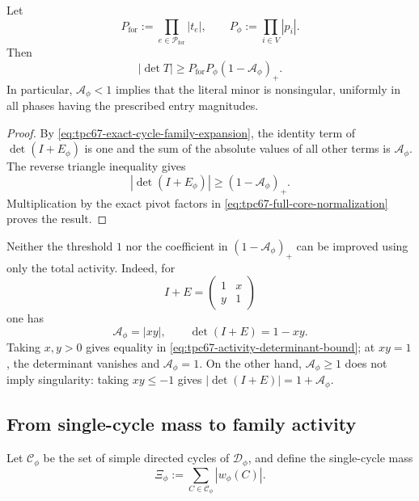 \begin{theorem}
\label{thm:tpc67-activity-certificate}
Let
\[
 P_{\mathrm{for}}
 :=
 \prod_{e\in\mathcal P_{\mathrm{for}}}|t_e|,
 \qquad
 P_\phi:=\prod_{i\in V}|p_i|.
\]
Then
\begin{equation}
 \boxed{
 |\det T|
 \ge
 P_{\mathrm{for}}P_\phi
 (1-\mathcal A_\phi)_+.}
 \label{eq:tpc67-activity-determinant-bound}
\end{equation}
In particular, \(\mathcal A_\phi<1\) implies that the literal minor is
nonsingular, uniformly in all phases having the prescribed entry
magnitudes.
\end{theorem}

\begin{proof}
By \eqref{eq:tpc67-exact-cycle-family-expansion}, the identity term of
\(\det(I+E_\phi)\) is one and the sum of the absolute values of all other
terms is \(\mathcal A_\phi\).  The reverse triangle inequality gives
\[
 |\det(I+E_\phi)|
 \ge (1-\mathcal A_\phi)_+.
\]
Multiplication by the exact pivot factors in
\eqref{eq:tpc67-full-core-normalization} proves the result.
\end{proof}

\begin{proposition}
\label{prop:tpc67-activity-threshold-sharp}
Neither the threshold \(1\) nor the coefficient in
\((1-\mathcal A_\phi)_+\) can be improved using only the total activity.
Indeed, for
\begin{equation}
 I+E=
 \begin{pmatrix}
 1&x\\
 y&1
 \end{pmatrix}
 \label{eq:tpc67-two-cycle-model}
\end{equation}
one has
\[
 \mathcal A_\phi=|xy|,
 \qquad
 \det(I+E)=1-xy.
\]
Taking \(x,y>0\) gives equality in
\eqref{eq:tpc67-activity-determinant-bound}; at \(xy=1\), the determinant
vanishes and \(\mathcal A_\phi=1\).  On the other hand,
\(\mathcal A_\phi\ge1\) does not imply singularity: taking \(xy\le-1\) gives
\(|\det(I+E)|=1+\mathcal A_\phi\).
\end{proposition}

\subsection{From single-cycle mass to family activity}

Let \(\mathscr C_\phi\) be the set of simple directed cycles of
\(\mathcal D_\phi\), and define the single-cycle mass
\begin{equation}
 \Xi_\phi
 :=
 \sum_{C\in\mathscr C_\phi}
 |w_\phi(C)|.
 \label{eq:tpc67-single-cycle-mass}
\end{equation}

